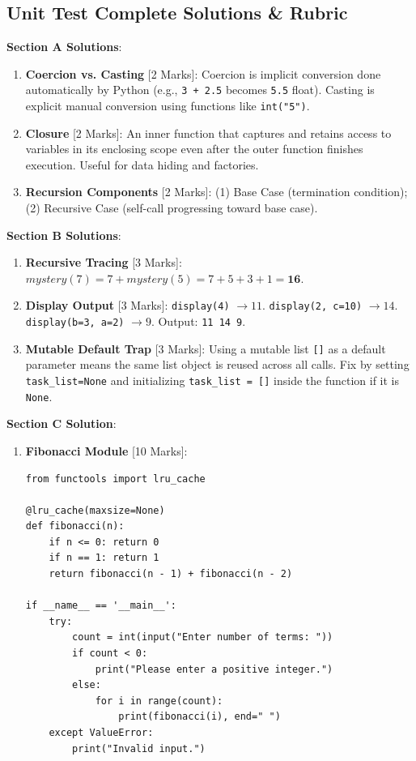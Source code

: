\subsection{Unit Test Complete Solutions \& Rubric}

\begin{solutionbox}
\noindent\textbf{Section A Solutions}:
\begin{enumerate}
    \item \textbf{Coercion vs. Casting} [2 Marks]: Coercion is implicit conversion done automatically by Python (e.g., \texttt{3 + 2.5} becomes \texttt{5.5} float). Casting is explicit manual conversion using functions like \texttt{int("5")}.
    \item \textbf{Closure} [2 Marks]: An inner function that captures and retains access to variables in its enclosing scope even after the outer function finishes execution. Useful for data hiding and factories.
    \item \textbf{Recursion Components} [2 Marks]: (1) Base Case (termination condition); (2) Recursive Case (self-call progressing toward base case).
\end{enumerate}

\noindent\textbf{Section B Solutions}:
\begin{enumerate}[start=4]
    \item \textbf{Recursive Tracing} [3 Marks]:
    $mystery(7) = 7 + mystery(5) = 7 + 5 + 3 + 1 = \mathbf{16}$.
    \item \textbf{Display Output} [3 Marks]:
    \texttt{display(4)} $\to 11$. \texttt{display(2, c=10)} $\to 14$. \texttt{display(b=3, a=2)} $\to 9$. Output: \texttt{11 14 9}.
    \item \textbf{Mutable Default Trap} [3 Marks]: Using a mutable list \texttt{[]} as a default parameter means the same list object is reused across all calls. Fix by setting \texttt{task\_list=None} and initializing \texttt{task\_list = []} inside the function if it is \texttt{None}.
\end{enumerate}

\noindent\textbf{Section C Solution}:
\begin{enumerate}[start=7]
    \item \textbf{Fibonacci Module} [10 Marks]:
\begin{lstlisting}[language=Python3]
from functools import lru_cache

@lru_cache(maxsize=None)
def fibonacci(n):
    if n <= 0: return 0
    if n == 1: return 1
    return fibonacci(n - 1) + fibonacci(n - 2)

if __name__ == '__main__':
    try:
        count = int(input("Enter number of terms: "))
        if count < 0:
            print("Please enter a positive integer.")
        else:
            for i in range(count):
                print(fibonacci(i), end=" ")
    except ValueError:
        print("Invalid input.")
\end{lstlisting}
\end{enumerate}
\end{solutionbox}
